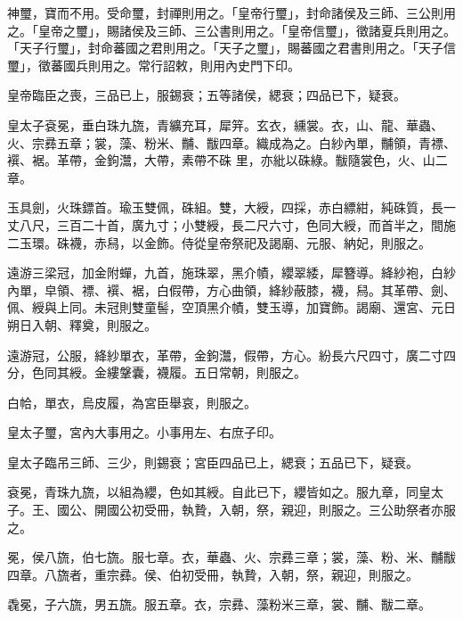 \begin{pinyinscope}
 神璽，寶而不用。受命璽，封禪則用之。「皇帝行璽」，封命諸侯及三師、三公則用之。「皇帝之璽」，賜諸侯及三師、三公書則用之。「皇帝信璽」，徵諸夏兵則用之。「天子行璽」，封命蕃國之君則用之。「天子之璽」，賜蕃國之君書則用之。「天子信璽」，徵蕃國兵則用之。常行詔敕，則用內史門下印。



 皇帝臨臣之喪，三品已上，服錫衰；五等諸侯，緦衰；四品已下，疑衰。



 皇太子袞冕，垂白珠九旒，青纊充耳，犀笄。玄衣，纁裳。衣，山、龍、華蟲、火、宗彞五章；裳，藻、粉米、黼、黻四章。織成為之。白紗內單，黼領，青褾、襈、裾。革帶，金鉤灊，大帶，素帶不硃
 里，亦紕以硃綠。黻隨裳色，火、山二章。



 玉具劍，火珠鏢首。瑜玉雙佩，硃組。雙，大綬，四採，赤白縹紺，純硃質，長一丈八尺，三百二十首，廣九寸；小雙綬，長二尺六寸，色同大綬，而首半之，間施二玉環。硃襪，赤舄，以金飾。侍從皇帝祭祀及謁廟、元服、納妃，則服之。



 遠游三梁冠，加金附蟬，九首，施珠翠，黑介幘，纓翠緌，犀簪導。絳紗袍，白紗內單，皁領、褾、襈、裾，白假帶，方心曲領，絳紗蔽膝，襪，舄。其革帶、劍、佩、綬與上同。未冠則雙童髻，空頂黑介幘，雙玉導，加寶飾。謁廟、還宮、元日朔日入朝、釋奠，則服之。



 遠游冠，公服，絳紗單衣，革帶，金鉤灊，假帶，方心。紛長六尺四寸，廣二寸四分，色同其綬。金縷鞶囊，襪履。五日常朝，則服之。



 白帢，單衣，烏皮履，為宮臣舉哀，則服之。



 皇太子璽，宮內大事用之。小事用左、右庶子印。



 皇太子臨吊三師、三少，則錫衰；宮臣四品已上，緦衰；五品已下，疑衰。



 袞冕，青珠九旒，以組為纓，色如其綬。自此已下，纓皆如之。服九章，同皇太子。王、國公、開國公初受冊，執贄，入朝，祭，親迎，則服之。三公助祭者亦服之。



 冕，侯八旒，伯七旒。服七章。衣，華蟲、火、宗彞三章；裳，藻、粉、米、黼黻四章。八旒者，重宗彞。侯、伯初受冊，執贄，入朝，祭，親迎，則服之。



 毳冕，子六旒，男五旒。服五章。衣，宗彞、藻粉米三章，裳、黼、黻二章。




\end{pinyinscope}
